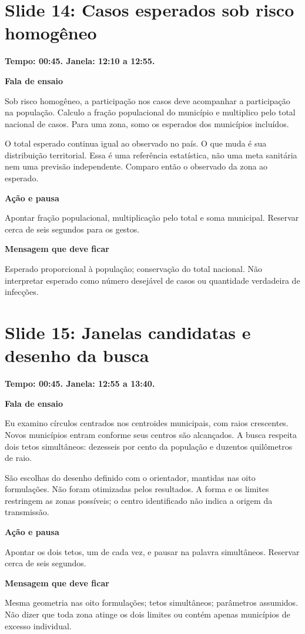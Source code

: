 \documentclass[11pt,a4paper]{article}
\newcommand{\bloco}[1]{\par\Needspace{3\baselineskip}\textbf{#1}\par}
\newcommand{\slide}[2]{\Needspace{13\baselineskip}\section*{Slide #1: #2}}
\begin{document}
\par\begin{minipage}{\textwidth}
\slide{14}{Casos esperados sob risco homogêneo}
{\color{azul}\textbf{Tempo: 00:45. Janela: 12:10 a 12:55.}}\par
\bloco{Fala de ensaio}
Sob risco homogêneo, a participação nos casos deve acompanhar a participação na população. Calculo a fração populacional do município e multiplico pelo total nacional de casos. Para uma zona, somo os esperados dos municípios incluídos.

O total esperado continua igual ao observado no país. O que muda é sua distribuição territorial. Essa é uma referência estatística, não uma meta sanitária nem uma previsão independente. Comparo então o observado da zona ao esperado.
\bloco{Ação e pausa}
Apontar fração populacional, multiplicação pelo total e soma municipal. Reservar cerca de seis segundos para os gestos.
\bloco{Mensagem que deve ficar}
Esperado proporcional à população; conservação do total nacional. Não interpretar esperado como número desejável de casos ou quantidade verdadeira de infecções.
\end{minipage}\par\bigskip
\par\begin{minipage}{\textwidth}
\slide{15}{Janelas candidatas e desenho da busca}
{\color{azul}\textbf{Tempo: 00:45. Janela: 12:55 a 13:40.}}\par
\bloco{Fala de ensaio}
Eu examino círculos centrados nos centroides municipais, com raios crescentes. Novos municípios entram conforme seus centros são alcançados. A busca respeita dois tetos simultâneos: dezesseis por cento da população e duzentos quilômetros de raio.

São escolhas do desenho definido com o orientador, mantidas nas oito formulações. Não foram otimizadas pelos resultados. A forma e os limites restringem as zonas possíveis; o centro identificado não indica a origem da transmissão.
\bloco{Ação e pausa}
Apontar os dois tetos, um de cada vez, e pausar na palavra simultâneos. Reservar cerca de seis segundos.
\bloco{Mensagem que deve ficar}
Mesma geometria nas oito formulações; tetos simultâneos; parâmetros assumidos. Não dizer que toda zona atinge os dois limites ou contém apenas municípios de excesso individual.
\end{minipage}\par\bigskip
\end{document}
